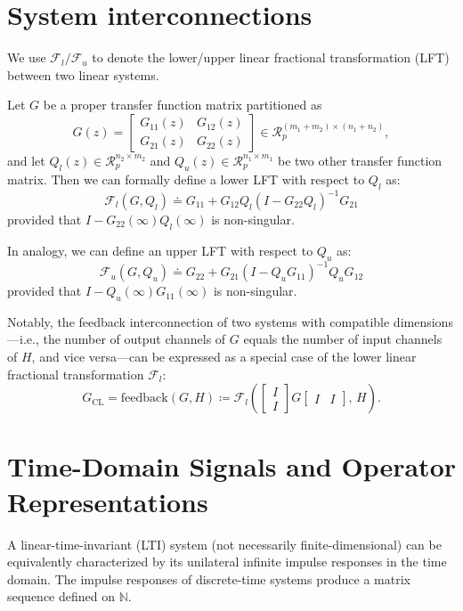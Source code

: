 \section{System interconnections}
We use \(\mathcal{F}_l/\mathcal{F}_u\) to denote the lower/upper linear fractional transformation (LFT) between two linear systems. 
\begin{defn}
Let \(G\) be a proper transfer function matrix partitioned as
\[
G(z) = \begin{bmatrix}
    G_{11}(z) & G_{12}(z) \\
    G_{21}(z) & G_{22}(z)
\end{bmatrix} \in \mathcal{R}_p^{(m_1 + m_2)\times (n_1 +n_2)},
\]
and let \(Q_l(z) \in \mathcal{R}_p^{n_2 \times m_2}\) and \(Q_u(z) \in \mathcal{R}_p^{n_1 \times m_1}\) be two other transfer function matrix. Then we can formally define a lower LFT with respect to \(Q_l\) as:
\[
\mathcal{F}_l(G,Q_l) \doteq G_{11} + G_{12} Q_l (I - G_{22} Q_l)^{-1} G_{21}
\]
provided that \(I - G_{22}(\infty) Q_l(\infty)\) is non-singular.

In analogy, we can define an upper LFT with respect to \(Q_u\) as:
\[
\mathcal{F}_u(G,Q_u) \doteq G_{22} + G_{21} (I - Q_u G_{11})^{-1} Q_u G_{12}
\]
provided that \(I - Q_u(\infty) G_{11}(\infty) \) is non-singular.
\end{defn}

Notably, the feedback interconnection of two systems with compatible dimensions—i.e., the number of output channels of \(G\) equals the number of input channels of \(H\), and vice versa—can be expressed as a special case of the lower linear fractional transformation \(\mathcal{F}_l\):
\[
G_{\mathrm{CL}} = \mathrm{feedback}(G,H) 
\coloneqq 
\mathcal{F}_l\!\left(
\begin{bmatrix}
    I \\[2pt]
    I
\end{bmatrix}
G
\begin{bmatrix}
    I & I
\end{bmatrix},\, H
\right).
\]

\section{Time-Domain Signals and Operator Representations}
A linear-time-invariant (LTI) system (not necessarily finite-dimensional) can be equivalently characterized by its unilateral infinite impulse responses in the time domain. The impulse responses of discrete-time systems produce a matrix sequence defined on \(\mathbb{N}\).


